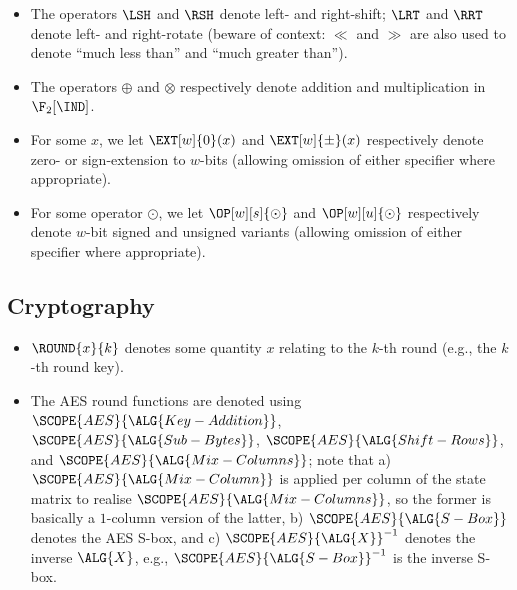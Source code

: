 \begin{itemize}

\item The operators $\LSH$ and $\RSH$ denote left- and right-shift; $\LRT$ and
      $\RRT$ denote left- and right-rotate (beware of context: $\ll$ and $\gg$
      are also used to denote ``much less than'' and ``much greater than'').
\item The operators 
      $\oplus$
      and
      $\otimes$
      respectively denote addition and multiplication in $\F_2[\IND]$.
\item For some $x$, 
      we let
      $\EXT[w]{0  }( x )$
      and
      $\EXT[w]{\pm}( x )$
      respectively denote
      zero- or sign-extension to $w$-bits
      (allowing omission of either specifier where appropriate).
\item For some operator $\odot$, 
      we let
      $\OP[w][s]{\odot}$
      and 
      $\OP[w][u]{\odot}$
      respectively denote 
      $w$-bit signed and unsigned variants
      (allowing omission of either specifier where appropriate).

\end{itemize}


\subsection{Cryptography}

\begin{itemize}

\item $\ROUND{x}{k}$ denotes some quantity $x$ relating to the $k$-th 
      round (e.g., the $k$-th round key).
\item The AES round functions are denoted using
      $\SCOPE{AES}{\ALG{Key-Addition}}$,
      $\SCOPE{AES}{\ALG{Sub-Bytes}}$,
      $\SCOPE{AES}{\ALG{Shift-Rows}}$,
      and
      $\SCOPE{AES}{\ALG{Mix-Columns}}$;
      note that 
      a) $\SCOPE{AES}{\ALG{Mix-Column}}$ is applied per column of the
         state matrix to realise $\SCOPE{AES}{\ALG{Mix-Columns}}$, so
         the former is basically a $1$-column version of the latter,
      b) $\SCOPE{AES}{\ALG{S-Box}}$ denotes the AES S-box,
         and
      c) $\SCOPE{AES}{\ALG{X}}^{-1}$ denotes the inverse $\ALG{X}$,
         e.g., $\SCOPE{AES}{\ALG{S-Box}}^{-1}$ is the inverse S-box.

\end{itemize}

